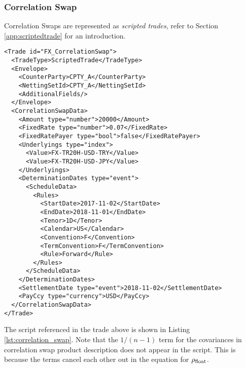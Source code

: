 \subsubsection{Correlation Swap} 
 
 
Correlation Swaps are represented as {\em scripted trades}, refer to Section 
\ref{app:scriptedtrade} for an introduction.
 
\begin{verbatim} 
<Trade id="FX_CorrelationSwap">
  <TradeType>ScriptedTrade</TradeType>
  <Envelope>
    <CounterParty>CPTY_A</CounterParty>
    <NettingSetId>CPTY_A</NettingSetId>
    <AdditionalFields/>
  </Envelope>
  <CorrelationSwapData>
    <Amount type="number">20000</Amount>
    <FixedRate type="number">0.07</FixedRate>
    <FixedRatePayer type="bool">false</FixedRatePayer>
    <Underlyings type="index">
      <Value>FX-TR20H-USD-TRY</Value>
      <Value>FX-TR20H-USD-JPY</Value>
    </Underlyings>
    <DeterminationDates type="event">
      <ScheduleData>
        <Rules>
          <StartDate>2017-11-02</StartDate>
          <EndDate>2018-11-01</EndDate>
          <Tenor>1D</Tenor>
          <Calendar>US</Calendar>
          <Convention>F</Convention>
          <TermConvention>F</TermConvention>
          <Rule>Forward</Rule>
        </Rules>
      </ScheduleData>
    </DeterminationDates>
    <SettlementDate type="event">2018-11-02</SettlementDate>
    <PayCcy type="currency">USD</PayCcy>
  </CorrelationSwapData>
</Trade>
\end{verbatim} 
 
The script referenced in the trade above is shown in Listing \ref{lst:correlation_swap}. Note that the $1/(n-1)$ term for the covariances in correlation swap product description does not appear in the script. This is because the terms cancel each other out in the equation for $\rho_{\rm float}$.
 
